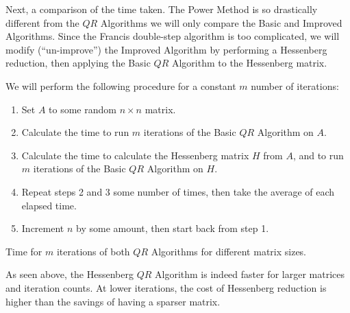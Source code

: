 \documentclass{article}
\begin{document}
Next, a comparison of the time taken. The Power Method is so drastically different from the $QR$ Algorithms we will only compare the Basic and Improved Algorithms. Since the Francis double-step algorithm is too complicated, we will modify (``un-improve'') the Improved Algorithm by performing a Hessenberg reduction, then applying the Basic $QR$ Algorithm to the Hessenberg matrix.

We will perform the following procedure for a constant $m$ number of iterations:
\begin{enumerate}
	\item Set $A$ to some random $n\times n$ matrix.
	\item Calculate the time to run $m$ iterations of the Basic $QR$ Algorithm on $A$.
	\item Calculate the time to calculate the Hessenberg matrix $H$ from $A$, and to run $m$ iterations of the Basic $QR$ Algorithm on $H$.
	\item Repeat steps 2 and 3 some number of times, then take the average of each elapsed time.
	\item Increment $n$ by some amount, then start back from step 1.
\end{enumerate}

\begin{center}
	\resizebox{0.49\textwidth}{!}{}
	\resizebox{0.49\textwidth}{!}{}

	\resizebox{0.49\textwidth}{!}{}
	\resizebox{0.49\textwidth}{!}{}

	Time for $m$ iterations of both $QR$ Algorithms for different matrix sizes.
\end{center}

As seen above, the Hessenberg $QR$ Algorithm is indeed faster for larger matrices and iteration counts. At lower iterations, the cost of Hessenberg reduction is higher than the savings of having a sparser matrix.

\pagebreak
\printbibliography
\end{document}
